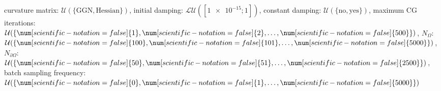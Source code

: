 curvature matrix: $\mathcal{U}(\{\text{GGN},\text{Hessian}\})$, initial damping: $\mathcal{LU}([\num[scientific-notation=true]{1e-15}; \num[scientific-notation=false]{1}])$, constant damping: $\mathcal{U}(\{\text{no},\text{yes}\})$, maximum CG iterations: $\mathcal{U}(\{\num[scientific-notation=false]{1},\num[scientific-notation=false]{2},\text{\dots},\num[scientific-notation=false]{500}\})$, $N_{\Omega}$: $\mathcal{U}(\{\num[scientific-notation=false]{100},\num[scientific-notation=false]{101},\text{\dots},\num[scientific-notation=false]{5000}\})$, $N_{\partial\Omega}$: $\mathcal{U}(\{\num[scientific-notation=false]{50},\num[scientific-notation=false]{51},\text{\dots},\num[scientific-notation=false]{2500}\})$, batch sampling frequency: $\mathcal{U}(\{\num[scientific-notation=false]{0},\num[scientific-notation=false]{1},\text{\dots},\num[scientific-notation=false]{5000}\})$